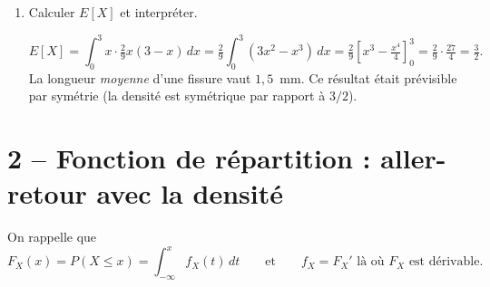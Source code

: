 \begin{enumerate}
\begin{solution}
    La densité en un point est une \textbf{densité} (comme une
    densité massique) : elle indique où la probabilité est plus
    \og concentrée \fg. La probabilité d'être dans un petit intervalle
    de longueur $\varepsilon$ autour de $x_0$ vaut approximativement
    $f(x_0)\,\varepsilon$.
  \end{solution}

  \item Calculer $E[X]$ et interpréter.
  \begin{solution}
    \[
      E[X]=\int_0^3 x\cdot\tfrac{2}{9}x(3-x)\,dx
      =\tfrac{2}{9}\int_0^3 (3x^2-x^3)\,dx
      =\tfrac{2}{9}\left[x^3-\tfrac{x^4}{4}\right]_0^3
      =\tfrac{2}{9}\cdot\tfrac{27}{4}=\tfrac{3}{2}.
    \]
    La longueur \emph{moyenne} d'une fissure vaut $1{,}5$~mm.
    Ce résultat était prévisible par symétrie
    (la densité est symétrique par rapport à $3/2$).
  \end{solution}
\end{enumerate}

\section*{2 -- Fonction de répartition : aller-retour avec la densité}

On rappelle que
\[
  F_X(x)=P(X\le x)=\int_{-\infty}^x f_X(t)\,dt
  \qquad\text{et}\qquad
  f_X=F_X'\text{ là où }F_X\text{ est dérivable.}
\]

